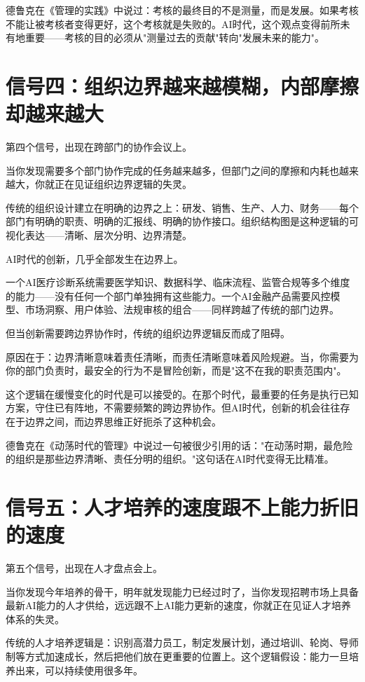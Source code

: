 德鲁克在《管理的实践》中说过：考核的最终目的不是测量，而是发展。如果考核不能让被考核者变得更好，这个考核就是失败的。AI时代，这个观点变得前所未有地重要——考核的目的必须从"测量过去的贡献"转向"发展未来的能力"。


\section{信号四：组织边界越来越模糊，内部摩擦却越来越大}


第四个信号，出现在跨部门的协作会议上。

当你发现需要多个部门协作完成的任务越来越多，但部门之间的摩擦和内耗也越来越大，你就正在见证组织边界逻辑的失灵。

传统的组织设计建立在明确的边界之上：研发、销售、生产、人力、财务——每个部门有明确的职责、明确的汇报线、明确的协作接口。组织结构图是这种逻辑的可视化表达——清晰、层次分明、边界清楚。

AI时代的创新，几乎全部发生在边界上。

一个AI医疗诊断系统需要医学知识、数据科学、临床流程、监管合规等多个维度的能力——没有任何一个部门单独拥有这些能力。一个AI金融产品需要风控模型、市场洞察、用户体验、法规审核的组合——同样跨越了传统的部门边界。

但当创新需要跨边界协作时，传统的组织边界逻辑反而成了阻碍。

原因在于：边界清晰意味着责任清晰，而责任清晰意味着风险规避。当，你需要为你的部门负责时，最安全的行为不是冒险创新，而是"这不在我的职责范围内"。

这个逻辑在缓慢变化的时代是可以接受的。在那个时代，最重要的任务是执行已知方案，守住已有阵地，不需要频繁的跨边界协作。但AI时代，创新的机会往往存在于边界之间，而边界思维正好扼杀了这种机会。

德鲁克在《动荡时代的管理》中说过一句被很少引用的话："在动荡时期，最危险的组织是那些边界清晰、责任分明的组织。"这句话在AI时代变得无比精准。


\section{信号五：人才培养的速度跟不上能力折旧的速度}


第五个信号，出现在人才盘点会上。

当你发现今年培养的骨干，明年就发现能力已经过时了，当你发现招聘市场上具备最新AI能力的人才供给，远远跟不上AI能力更新的速度，你就正在见证人才培养体系的失灵。

传统的人才培养逻辑是：识别高潜力员工，制定发展计划，通过培训、轮岗、导师制等方式加速成长，然后把他们放在更重要的位置上。这个逻辑假设：能力一旦培养出来，可以持续使用很多年。

